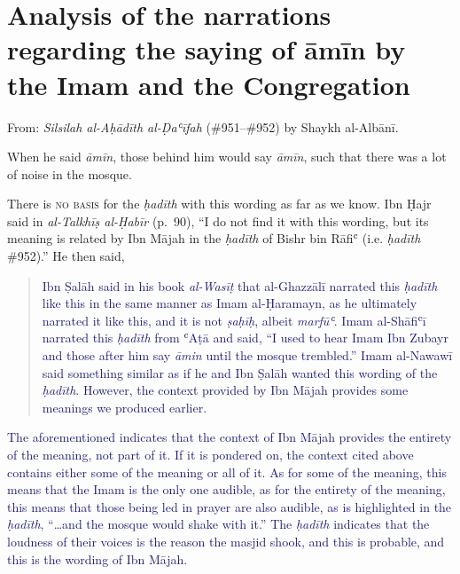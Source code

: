 \hypertarget{analysis-of-the-narrations-regarding-the-saying-of-ux101mux12bn-by-the-imam-and-the-congregation}{%
\chapter{Analysis of the narrations regarding the saying of āmīn by the
Imam and the
Congregation}\label{analysis-of-the-narrations-regarding-the-saying-of-ux101mux12bn-by-the-imam-and-the-congregation}}


From: \emph{Silsilah al-Aḥādīth al-Ḍaʿīfah} (\#951--\#952) by Shaykh
al-Albānī.

\begin{mdframed}[style=narration, frametitle={Narration \#951}]
When he said \textit{āmīn}, those behind him would say \textit{āmīn}, such that there was a lot of noise in the mosque.
\end{mdframed}

There is \textsc{no basis} for the \emph{ḥadīth} with this wording as
far as we know. Ibn Ḥajr said in \emph{al-Talkhīṣ al-Ḥabīr} (p.~90), ``I
do not find it with this wording, but its meaning is related by Ibn
Mājah in the \emph{ḥadīth} of Bishr bin Rāfiʿ (i.e. \textit{ḥadīth} \#952).'' He then said,

\begin{quote}
\textcolor{MidnightBlue}{Ibn Ṣalāh said in his book
\emph{al-Wasīṭ} that al-Ghazzālī narrated this \emph{ḥadīth} like this
in the same manner as Imam al-Ḥaramayn, as he ultimately narrated it
like this, and it is not \emph{ṣaḥīḥ}, albeit \emph{marfūʿ}. Imam
al-Shāfiʿī narrated this \emph{ḥadīth} from ʿAṭā and said, “I used to
hear Imam Ibn Zubayr and those after him say \emph{āmin} until the
mosque trembled.” Imam al-Nawawī said something similar as if he and Ibn
Ṣalāh wanted this wording of the \emph{ḥadīth}. However, the context
provided by Ibn Mājah provides some meanings we produced earlier.}
\end{quote}

\textcolor{MidnightBlue}{The aforementioned
indicates that the context of Ibn Mājah provides the entirety of the
meaning, not part of it. If it is pondered on, the context cited above
contains either some of the meaning or all of it. As for some of the
meaning, this means that the Imam is the only one audible, as for the
entirety of the meaning, this means that those being led in prayer are
also audible, as is highlighted in the \emph{ḥadīth}, ``\ldots and the
mosque would shake with it.'' The \emph{ḥadīth} indicates that the
loudness of their voices is the reason the masjid shook, and this is
probable, and this is the wording of Ibn Mājah.}

